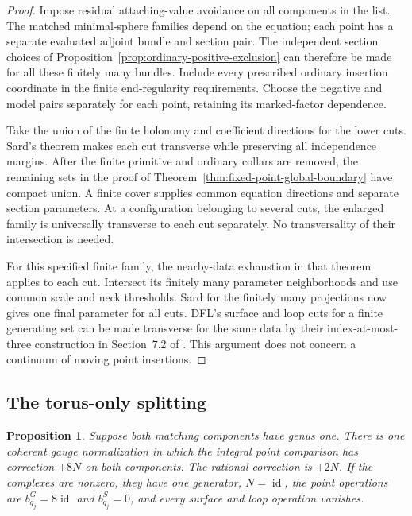 \documentclass[11pt]{amsart}
\newtheorem{proposition}[theorem]{Proposition}
\theoremstyle{definition}
\theoremstyle{remark}
\theoremstyle{plain}
\newcommand{\id}{\operatorname{id}}
\begin{document}
\begin{proof}
Impose residual attaching-value avoidance on all components
in the list. The matched minimal-sphere families depend on
the equation; each point has a separate evaluated adjoint
bundle and section pair. The independent section choices
of Proposition~\ref{prop:ordinary-positive-exclusion}
can therefore be made for all these finitely many bundles.
Include every prescribed ordinary insertion coordinate
in the finite end-regularity requirements.
Choose the negative and model pairs separately for each
point, retaining its marked-factor dependence.

Take the union of the finite holonomy and coefficient
directions for the lower cuts. Sard's theorem makes
each cut transverse while preserving all independence
margins. After the finite primitive and ordinary collars
are removed, the remaining sets in the proof of
Theorem~\ref{thm:fixed-point-global-boundary} have
compact union. A finite cover supplies common equation
directions and separate section parameters. At a
configuration belonging to several cuts, the enlarged
family is universally transverse to each cut separately.
No transversality of their intersection is needed.

For this specified finite family, the nearby-data
exhaustion in that theorem applies to each cut.
Intersect its finitely many parameter neighborhoods
and use common scale and neck thresholds. Sard for
the finitely many projections now gives one final
parameter for all cuts. DFL's surface and loop cuts
for a finite generating set can be made transverse
for the same data by their index-at-most-three
construction in Section~7.2 of \cite{DaeFukLip21a}.
This argument does not concern a continuum of
moving point insertions.
\end{proof}

\subsection{The torus-only splitting}
\label{sec:torus-only-comparison}

\begin{proposition}\label{prop:torus-only-comparison}
Suppose both matching components have genus one.
There is one coherent gauge normalization in which
the integral point comparison has correction $+8N$
on both components. The rational correction is $+2N$.
If the complexes are nonzero, they have one generator,
$N=\id$, the point operations are
$b_{q_j}^G=8\id$ and $b_{q_j}^S=0$, and every
surface and loop operation vanishes.
\end{proposition}
\end{document}
